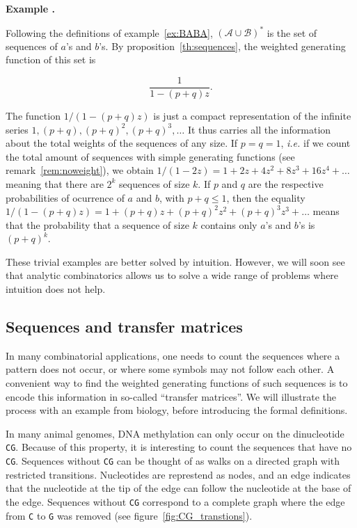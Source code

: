 \documentclass{article}
\newcounter{examplecounter}
\newenvironment{example}
{\small\vspace{0.5\baselineskip}
  \refstepcounter{examplecounter}%
  \noindent\textbf{Example \arabic{examplecounter}.}%
}{\vspace{0.5\baselineskip}}
\begin{document}
\begin{example}
\label{ex:AUB+}
Following the definitions of example~\ref{ex:BABA}, $(\mathcal{A} \cup
\mathcal{B})^*$ is the set of sequences of $a$'s and $b$'s. By
proposition~\ref{th:sequences}, the weighted generating function of this
set is

\begin{equation*}
\frac{1}{1-(p+q)z}.
\end{equation*}

The function $1 / (1-(p+q)z)$ is just a compact representation of the
infinite series $1, (p+q), (p+q)^2, (p+q)^3, \ldots$ It thus carries all
the information about the total weights of the sequences of any size. If
$p = q = 1$, \textit{i.e.} if we count the total amount of sequences with
simple generating functions (see remark~\ref{rem:noweight}), we obtain
$1/(1-2z) = 1+ 2z + 4z^2 + 8z^3 + 16z^4 + \ldots$ meaning that there are
$2^k$ sequences of size $k$. If $p$ and $q$ are the respective
probabilities of ocurrence of $a$ and $b$, with $p + q \leq 1$, then the
equality $1 / (1-(p+q)z) = 1+ (p+q)z + (p+q)^2z^2 + (p+q)^3z^3 + \ldots$
means that the probability that a sequence of size $k$ contains only $a$'s
and $b$'s is $(p+q)^k$.
\end{example}

These trivial examples are better solved by intuition. However, we will
soon see that analytic combinatorics allows us to solve a wide range of
problems where intuition does not help.




\subsection{Sequences and transfer matrices}

In many combinatorial applications, one needs to count the sequences where
a pattern does not occur, or where some symbols may not follow each other.
A convenient way to find the weighted generating functions of such
sequences is to encode this information in so-called ``transfer
matrices''. We will illustrate the process with an example from biology,
before introducing the formal definitions.

In many animal genomes, DNA methylation can only occur on the dinucleotide
\texttt{CG}. Because of this property, it is interesting to count the
sequences that have no \texttt{CG}. Sequences without \texttt{CG} can be
thought of as walks on a directed graph with restricted transitions.
Nucleotides are represtend as nodes, and an edge indicates that the
nucleotide at the tip of the edge can follow the nucleotide at the base of
the edge. Sequences without \texttt{CG} correspond to a complete graph
where the edge from \texttt{C} to \texttt{G} was removed (see
figure~\ref{fig:CG_transtions}).
\end{document}
